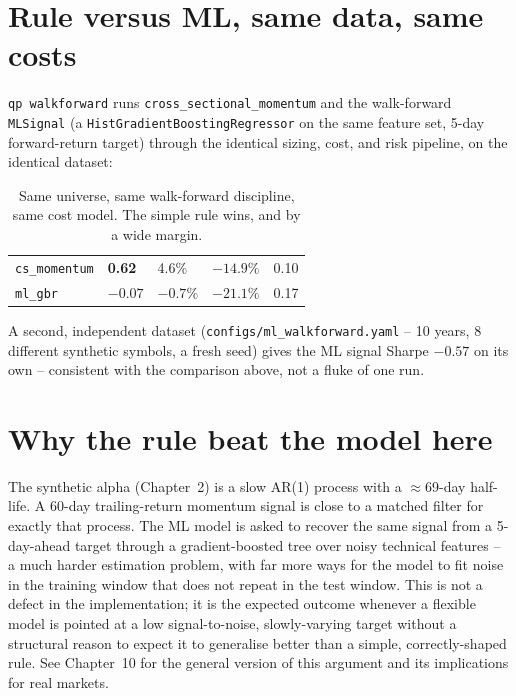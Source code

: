 \section{Rule versus ML, same data, same costs}

\texttt{qp walkforward} runs \texttt{cross\_sectional\_momentum} and the
walk-forward \texttt{MLSignal} (a \texttt{HistGradientBoostingRegressor} on the
same feature set, 5-day forward-return target) through the identical sizing,
cost, and risk pipeline, on the identical dataset:

\begin{table}[h]
\footnotesize
\centering
\begin{tabularx}{\textwidth}{L{4cm} C{2.2cm} C{2.2cm} C{2.6cm} X}
\toprule
{} &  &  &  &  \\
\midrule
\texttt{cs\_momentum} & \textbf{0.62} & 4.6\% & $-14.9\%$ & 0.10 \\
\texttt{ml\_gbr} & $-0.07$ & $-0.7\%$ & $-21.1\%$ & 0.17 \\
\bottomrule
\end{tabularx}
\caption{Same universe, same walk-forward discipline, same cost model. The
simple rule wins, and by a wide margin.}
\end{table}

A second, independent dataset (\texttt{configs/ml\_walkforward.yaml} --
10 years, 8 different synthetic symbols, a fresh seed) gives the ML signal
Sharpe $-0.57$ on its own -- consistent with the comparison above, not a fluke
of one run.

\section{Why the rule beat the model here}

The synthetic alpha (Chapter~2) is a slow AR(1) process with a $\approx$69-day
half-life. A 60-day trailing-return momentum signal is close to a matched
filter for exactly that process. The ML model is asked to recover the same
signal from a 5-day-ahead target through a gradient-boosted tree over noisy
technical features -- a much harder estimation problem, with far more ways for
the model to fit noise in the training window that does not repeat in the test
window. This is not a defect in the implementation; it is the expected outcome
whenever a flexible model is pointed at a low signal-to-noise, slowly-varying
target without a structural reason to expect it to generalise better than a
simple, correctly-shaped rule. See Chapter~10 for the general version of this
argument and its implications for real markets.

